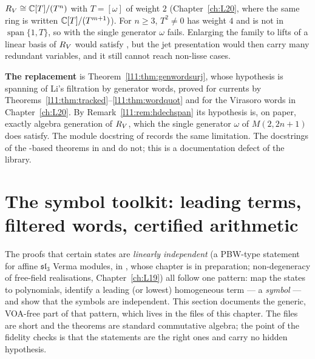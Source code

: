 \begin{warning}
\begin{enumerate}
  $R_V\cong{\mathbb{C}}[T]/(T^{n})$ with $T = [\omega]$ of weight $2$ (Chapter~\ref{ch:L20}, where the same ring is written
  ${\mathbb{C}}[T]/(T^{m+1})$). For $n\ge3$, $T^2\neq0$ has weight $4$
  and is not in $\operatorname{span}\{1,T\}$, so  with the single generator $\omega$ fails. Enlarging the family
  to lifts of a linear basis of $R_V$ would satisfy , but the jet presentation would then carry many
  redundant variables, and it still cannot reach non-lisse cases.
\end{enumerate}
\textbf{The replacement} is Theorem~\ref{l11:thm:genwordsurj}, whose hypothesis is spanning of Li's filtration by
generator words, proved for currents by Theorems~\ref{l11:thm:tracked}--\ref{l11:thm:wordquot} and for the Virasoro
words in Chapter~\ref{ch:L20}. By Remark~\ref{l11:rem:hdechspan} its hypothesis is, on paper, exactly algebra generation of
$R_V$, which the single generator $\omega$ of $M(2,2n+1)$ does satisfy. The module docstring of
 records the same limitation. The docstrings
of the -based theorems in  and  do not; this
is a documentation defect of the library.
\end{warning}

\section{The symbol toolkit: leading terms, filtered words, certified arithmetic}\label{l11:sec:symbols}

The proofs that certain states are \emph{linearly independent} (a PBW-type statement for affine
$\mathfrak{sl}_3$ Verma modules, in , whose chapter is in
preparation; non-degeneracy of free-field realisations,
Chapter~\ref{ch:L19}) all follow one pattern: map the states to polynomials, identify a leading (or lowest)
homogeneous term --- a \emph{symbol} --- and show that the symbols are independent. This section documents
the generic, VOA-free part of that pattern, which lives in the files of this chapter. The files are short and
the theorems are standard commutative algebra; the point of the fidelity checks is that the statements are
the right ones and carry no hidden hypothesis.

